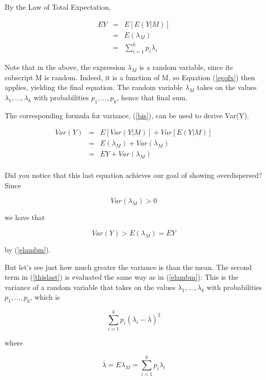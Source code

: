 \documentclass[11pt]{article}
\begin{document}
By the Law of Total Expectation,

\begin{eqnarray}
\label{meanlamb}
EY &=& E[E(Y|M)] \\ 
&=& E(\lambda_M) \label{elambm} \\
&=& \sum_{i=1}^k p_i \lambda_i
\end{eqnarray}

Note that in the above, the expression $\lambda_M$ is a random variable,
since its subscript M is random.  Indeed, it is a function of M, so
Equation (\ref{egofx}) then applies, yielding the final equation.  The
random variable $\lambda_M$ takes on the values $\lambda_1,...,\lambda_k$
with probabilities $p_1,...,p_k$, hence that final sum.

The corresponding formula for variance, (\ref{bis}), can be used to
derive Var(Y).

\begin{eqnarray}
Var(Y) &=& E[Var(Y|M)] + Var[E(Y|M)] \\ 
&=& E(\lambda_M) + Var(\lambda_M) \label{thislast} \\
&=& EY + Var(\lambda_M) \label{thislast} \\
\end{eqnarray}

Did you notice that this last equation achieves our goal of showing
overdispersed?  Since

\begin{equation}
Var(\lambda_M) > 0
\end{equation}

we have that

\begin{equation}
Var(Y) > E(\lambda_M) = EY
\end{equation}

by (\ref{elambm}).

But let's see just how much greater the variance is than the mean.  The
second term in (\ref{thislast}) is evaluated the same way as in
(\ref{elambm}):  This is the variance of a random variable that takes on
the values $\lambda_1,...,\lambda_k$ with probabilities $p_1,...,p_k$,
which is

\begin{equation}
\sum_{i=1}^k p_i (\lambda_i - \overline{\lambda})^2
\end{equation}

where 

\begin{equation}
\overline{\lambda} =  E\lambda_M = \sum_{i=1}^k p_i \lambda_i
\end{equation}
\end{document}

